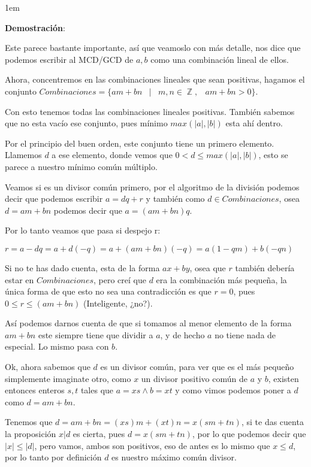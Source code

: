 \documentclass[12pt, fleqn]{report}                             %
\newcommand \Quote {\qq}                                        %
\newenvironment{SmallIndentation}[1][0.75em]                    %
    {\begin{adjustwidth}{#1}{}\begin{footnotesize}}                 %
    {\end{footnotesize}\end{adjustwidth}}                           %
\DeclareMathOperator \Space {\quad}                             %
\DeclareMathOperator \MiniSpace {\;}                            %
\newcommand \Such {\MiniSpace|\MiniSpace}                       %
\DeclareMathOperator \Integers  {\mathbb{Z}}                     %
\begin{document}
            \begin{SmallIndentation}[1em]
                \textbf{Demostración}:

                Este \Quote{teorema} parece bastante importante, así que veamoslo con más detalle,
                nos dice que podemos escribir al MCD/GCD de $a,b$ como una combinación lineal de
                ellos.

                Ahora, concentremos en las combinaciones lineales que sean positivas, hagamos el conjunto
                $Combinaciones = \{ am+bn \Such m, n \in \Integers, \MiniSpace am+bn > 0 \}$.

                Con esto tenemos todas las combinaciones lineales positivas.
                También sabemos que no esta vacío ese conjunto, pues mínimo $max(|a|,|b|)$ esta ahí dentro.

                Por el principio del buen orden, este conjunto tiene un primero elemento.
                Llamemos $d$ a ese elemento, donde vemos que $0 < d \leq max(|a|,|b|)$,
                esto se parece a nuestro mínimo común múltiplo.

                Veamos si es un divisor común primero, por el algoritmo de la división podemos decir
                que podemos escribir $a = dq + r$ y también como $d \in Combinaciones$, osea
                $d = am+bn$ podemos decir que $a = (am+bn)q$.

                Por lo tanto veamos que pasa si despejo r:

                $r = a-dq = a + d(-q) = a + (am+bn)(-q) = a(1-qm) + b(-qn)$

                Si no te has dado cuenta, esta de la forma $ax+by$, osea que $r$ también debería estar
                en $Combinaciones$, pero creí que $d$ era la combinación más pequeña, la única forma
                de que esto no sea una contradicción es que $r=0$, pues $0 \leq r \leq (am+bn)$
                (Inteligente, ¿no?).
                
                Así podemos darnos cuenta de que si tomamos al menor elemento de la forma $am+bn$ este
                siempre tiene que dividir a $a$, y de hecho $a$ no tiene nada de especial.
                Lo mismo pasa con $b$.

                Ok, ahora sabemos que $d$ es un divisor común, para ver que es el más pequeño
                simplemente imaginate otro, como $x$ un divisor positivo común de $a$ y $b$,
                existen entonces enteros $s,t$ tales que $a=xs \land b=xt$ y como vimos podemos poner a 
                $d$ como $d=am+bn$.

                Tenemos que $d = am+bn = (xs)m+(xt)n = x(sm+tn)$, si te das cuenta la proposición
                $x|d$ es cierta, pues $d = x(sm+tn)$, por lo que podemos decir que $|x| \leq |d|$, 
                pero vamos, ambos son positivos, eso de antes es lo mismo que $x \leq d$, por lo
                tanto por definición $d$ es nuestro máximo común divisor.

            \end{SmallIndentation}
\end{document}
